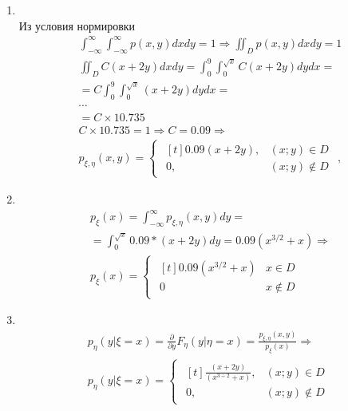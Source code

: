 \documentclass[12pt]{article}
\begin{document}
\begin{enumerate}
	\item \mbox{}\\
	      Из условия нормировки
	      \begin{gather*}
		      \int_{-\infty}^{\infty}\int_{-\infty}^{\infty}p(x,y)dxdy = 1 \Rightarrow \iint_{D}p(x,y)dxdy = 1 \\
		      \iint_{D}C(x + 2y)dxdy = \int_0^9\int_0^{\sqrt{x}}C(x + 2y)dydx = \\
		      = C\int_0^9\int_0^{\sqrt{x}}(x + 2y)dydx = \\
		      \cdots \\
		      = C \times 10.735 \\
		      C \times 10.735 = 1 \Rightarrow C = 0.09 \Rightarrow \\
		      p_{\xi,\eta}(x,y) =
		      \begin{cases}
			      \begin{aligned}[t]
				      0.09(x + 2y), & (x;y) \in D    \\
				      0,            & (x;y) \notin D
			      \end{aligned}
		      \end{cases},
	      \end{gather*}

	\item \mbox{}\\
	      \begin{gather*}
		      p_{\xi}(x) = \int_{-\infty}^{\infty}p_{\xi,\eta}(x,y)dy = \\
		      = \int_{0}^{\sqrt{x}}0.09 * (x + 2y)dy = 0.09(x^{3/2} + x) \Rightarrow \\
		      p_{\xi}(x) =
		      \begin{cases}
			      \begin{aligned}[t]
				      0.09(x^{3/2} + x) & x \in D    \\
				      0                 & x \notin D
			      \end{aligned}
		      \end{cases}
	      \end{gather*}

	\item \mbox{}\\
	      \begin{gather*}
		      p_{\eta}(y|\xi = x) = \frac{\partial}{\partial y}F_{\eta}(y|\eta = x)
		      = \frac{p_{\xi, \eta}(x, y)}{p_{\xi}(x)} \Rightarrow \\
		      p_{\eta}(y|\xi = x) =
		      \begin{cases}
			      \begin{aligned}[t]
				      \frac{(x + 2y)}{(x^{3\div2} + x)}, & (x;y) \in D \\
				      0,                                 & (x;y) \notin D
			      \end{aligned}
		      \end{cases}
	      \end{gather*}


\end{enumerate}
\end{document}
